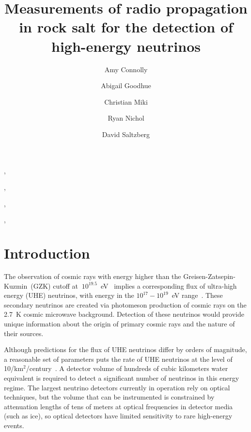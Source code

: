 \documentclass{elsart}
\begin{document}
  \begin{frontmatter}
    
    \title{Measurements of radio propagation in rock salt for the detection of high-energy neutrinos}
    \author[ucl]{Amy Connolly}, 
    \author[ucla]{Abigail Goodhue}, 
    \author[uh]{Christian Miki}, 
    \author[ucl]{Ryan Nichol}, 
    \author[ucla]{David Saltzberg}
    
    \address[ucl]{Department of Physics and Astronomy, University College London, Gower Street, London  WC1E 6BT}
    \address[ucla]{Department of Physics and Astronomy, UCLA, 475 Portola Plaza, Mailstop 154705, Los Angeles, CA 90095-1547, USA}
    \address[uh]{Department of Physics and Astronomy, University of Hawaii, 2505 Correa Rd., Honolulu, HI  96822, USA}

    \begin{abstract}
    \end{abstract}
    
    \begin{keyword}
      
      \PACS 
    \end{keyword}
  \end{frontmatter}
  
  \section{Introduction}
  The observation of cosmic rays with energy higher than the Greisen-Zatsepin-Kuzmin~(GZK) 
  cutoff at $~10^{19.5}$~eV~\cite{gzk} implies a corresponding flux of ultra-high energy (UHE) neutrinos, 
  with energy in the $10^{17}-10^{19}$~eV range~\cite{ess}.  These secondary neutrinos 
  are created via photomeson 
  production of cosmic rays on the 2.7~K cosmic microwave background.  Detection of these neutrinos 
  would provide unique information about the origin of primary cosmic rays and the nature 
  of their sources.
  
  Although predictions for the flux of UHE
  neutrinos differ by orders of magnitude, a reasonable set of parameters
  puts the rate of UHE neutrinos at the level of 10/km$^2$/century~\cite{ess}.
  A detector volume of hundreds of cubic kilometers 
  water equivalent is required to detect a significant 
  number of neutrinos in this energy regime.  The largest neutrino detectors 
  currently in operation rely on 
  optical techniques, but the volume that can be instrumented is 
  constrained by attenuation lengths of tens of meters %
  at optical frequencies in detector media (such as ice), so 
  optical detectors have limited sensitivity to rare high-energy events.
  
\end{document}
